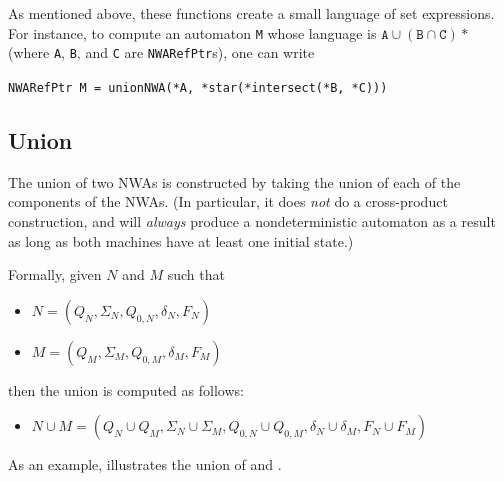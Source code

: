 As mentioned above, these functions create a small language of set
expressions. For instance, to compute an automaton \texttt{M} whose language
is $\texttt{A} \cup (\texttt{B} \cap \texttt{C})*$ (where \texttt{A},
\texttt{B}, and \texttt{C} are \texttt{NWARefPtr}s), one can write
\begin{center}
  \texttt{NWARefPtr M = unionNWA(*A, *star(*intersect(*B, *C)))}
\end{center}


\subsection{Union}
\label{Se:Union}
The union of two NWAs is constructed by taking the union of each of the
components of the NWAs. (In
particular, it does \textsl{not} do a cross-product construction, and will
\textsl{always} produce a nondeterministic automaton as a result as long as
both machines have at least one initial state.)

Formally, given $N$ and $M$ such that
\begin{itemize}
 \item $N = (Q_N, \Sigma_N, Q_{0,N}, \delta_N, F_N)$
 \item $M = (Q_M, \Sigma_M, Q_{0,M}, \delta_M, F_M)$
\end{itemize}
then the union is computed as follows:
\begin{itemize}
 \item $N \cup M = (Q_N \cup Q_M, \Sigma_N \cup \Sigma_M, Q_{0,N} \cup
   Q_{0,M}, \delta_N \cup \delta_M, F_N \cup F_M)$
\end{itemize}

As an example,  illustrates the union of  and
.


